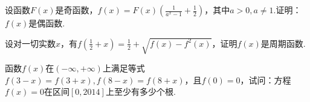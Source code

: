 \begin{xiti}
\item 设函数$F(x)$是奇函数，$f ( x ) = F ( x ) \left( \frac { 1 } { a ^ { x } - 1 } + \frac { 1 } { 2 } \right)$，其中$a>0,a\ne 1$.证明：$f(x)$是偶函数.
\item 设对一切实数$x$，有$f \left( \frac { 1 } { 2 } + x \right) = \frac { 1 } { 2 } + \sqrt { f ( x ) - f ^ { 2 } ( x ) }$，证明$f(x)$是周期函数.
%	
\item 函数$f(x)$在$(-\infty,+\infty)$上满足等式$f ( 3 - x ) = f ( 3 + x ) , f ( 8 - x ) = f ( 8 + x )$，且$f(0)=0$，试问：方程$f(x)=0$在区间$[0,2014]$上至少有多少个根.


\end{xiti}
